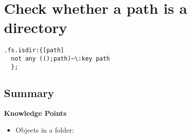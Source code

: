 \section{Check whether a path is a directory}

\begin{verbatim}
.fs.isdir:{[path]
  not any (();path)~\:key path
  };
\end{verbatim}

\subsection{Summary}

\begin{noteblock}
\textbf{Knowledge Points}
\begin{itemize}
\item Objects in a folder: \href{https://code.kx.com/q/ref/key/#files-in-a-folder}{}
\end{itemize}
\end{noteblock}

\clearpage
